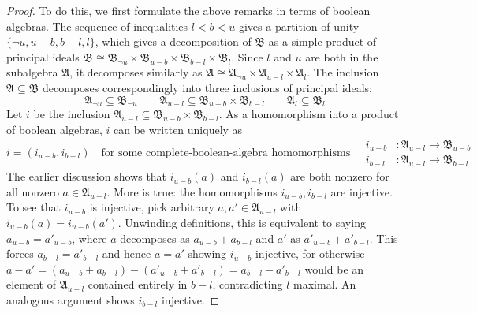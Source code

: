 \documentclass[
  sigconf,
  screen, ]{acmart}
\theoremstyle{definition}
\newcommand\frakA{\mathfrak A}
\newcommand\frakB{\mathfrak B}
\begin{document}
\begin{proof}
  To do this, we first formulate the above remarks
  in terms of boolean algebras.
  The sequence of inequalities $l < b < u$
  gives a partition of unity $\{\neg u, u - b, b - l, l\}$,
  which gives a decomposition of $\frakB$ as a simple product
  of principal ideals
  $
    \frakB \cong \frakB_{\neg u} \times \frakB_{u-b} \times \frakB_{b-l} \times \frakB_l
  $.
  Since $l$ and $u$ are both in the subalgebra $\frakA$, it decomposes similarly as
  $
    \frakA \cong \frakA_{\neg u} \times \frakA_{u-l} \times \frakA_l
  $.
  The inclusion $\frakA\subseteq\frakB$ decomposes correspondingly into three inclusions of principal ideals:
  \[
    \frakA_{\neg u}\subseteq \frakB_{\neg u}
    \qquad
    \frakA_{u-l}\subseteq \frakB_{u-b} \times \frakB_{b-l}
    \qquad
    \frakA_l\subseteq \frakB_l
  \]
  Let $i$ be the inclusion $\frakA_{u-l}\subseteq \frakB_{u-b} \times \frakB_{b-l}$.
  As a homomorphism into a product of boolean algebras,
  $i$ can be written uniquely as
  \[
    i = (i_{u-b},i_{b-l})
    \quad\text{for some complete-boolean-algebra homomorphisms}\quad
    \begin{aligned}
      i_{u-b} &: \frakA_{u-l} \to \frakB_{u-b} \\
      i_{b-l} &: \frakA_{u-l} \to \frakB_{b-l} 
    \end{aligned}
  \]
  The earlier discussion shows that $i_{u-b}(a)$ and $i_{b-l}(a)$
  are both nonzero for all nonzero $a\in\frakA_{u-l}$.
  More is true: the homomorphisms $i_{u-b},i_{b-l}$
  are injective.
  To see that $i_{u-b}$ is injective, pick arbitrary $a,a'\in \frakA_{u-l}$
  with $i_{u-b}(a) = i_{u-b}(a')$.
  Unwinding definitions, this is equivalent to saying
  $a_{u-b} = a'_{u-b}$,
  where $a$ decomposes as $a_{u-b} + a_{b-l}$
  and $a'$ as $a'_{u-b} +a'_{b-l}$.
  This forces $a_{b-l} = a'_{b-l}$ and hence $a=a'$ showing $i_{u-b}$ injective,
  for otherwise
  $ a - a' = (a_{u-b} +a_{b-l}) - (a'_{u-b} + a'_{b-l}) = a_{b-l} - a'_{b-l}$
  would be an element of $\frakA_{u-l}$ contained entirely in $b-l$,
  contradicting $l$ maximal.
  An analogous argument shows $i_{b-l}$ injective.


\end{proof}
\end{document}
